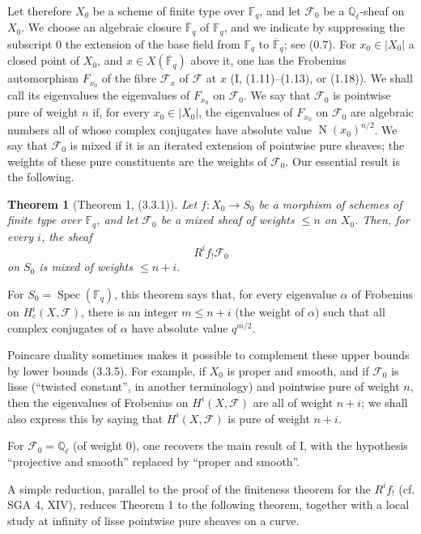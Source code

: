 \documentclass[11pt]{article}
\newtheorem{theorem}{Theorem}
\theoremstyle{remark}
\newcommand{\Ql}{\mathbb{Q}_\ell}
\newcommand{\Fq}{\mathbb{F}_q}
\newcommand{\Fbar}{\overline{\mathbb{F}}_q}
\newcommand{\Spec}{\operatorname{Spec}}
\newcommand{\Norm}{\operatorname{N}}
\begin{document}
Let therefore $X_0$ be a scheme of finite type over $\Fq$, and let $\mathcal F_0$ be a $\Ql$-sheaf on $X_0$. We choose an algebraic closure $\Fbar$ of $\Fq$, and we indicate by suppressing the subscript $0$ the extension of the base field from $\Fq$ to $\Fbar$; see (0.7). For $x_0\in |X_0|$ a closed point of $X_0$, and $x\in X(\Fbar)$ above it, one has the Frobenius automorphism $F_{x_0}$ of the fibre $\mathcal F_x$ of $\mathcal F$ at $x$ (I, (1.11)--(1.13), or (1.18)). We shall call its eigenvalues the eigenvalues of $F_{x_0}$ on $\mathcal F_0$. We say that $\mathcal F_0$ is pointwise pure of weight $n$ if, for every $x_0\in |X_0|$, the eigenvalues of $F_{x_0}$ on $\mathcal F_0$ are algebraic numbers all of whose complex conjugates have absolute value $\Norm(x_0)^{n/2}$. We say that $\mathcal F_0$ is mixed if it is an iterated extension of pointwise pure sheaves; the weights of these pure constituents are the weights of $\mathcal F_0$. Our essential result is the following.

\begin{theorem}[Theorem 1, (3.3.1)]
Let $f:X_0\to S_0$ be a morphism of schemes of finite type over $\Fq$, and let $\mathcal F_0$ be a mixed sheaf of weights $\le n$ on $X_0$. Then, for every $i$, the sheaf
\[
R^i f_{!}\mathcal F_0
\]
on $S_0$ is mixed of weights $\le n+i$.
\end{theorem}

For $S_0=\Spec(\Fq)$, this theorem says that, for every eigenvalue $\alpha$ of Frobenius on $H^i_c(X,\mathcal F)$, there is an integer $m\le n+i$ (the weight of $\alpha$) such that all complex conjugates of $\alpha$ have absolute value $q^{m/2}$.

Poincare duality sometimes makes it possible to complement these upper bounds by lower bounds (3.3.5). For example, if $X_0$ is proper and smooth, and if $\mathcal F_0$ is lisse (``twisted constant'', in another terminology) and pointwise pure of weight $n$, then the eigenvalues of Frobenius on $H^i(X,\mathcal F)$ are all of weight $n+i$; we shall also express this by saying that $H^i(X,\mathcal F)$ is pure of weight $n+i$.

For $\mathcal F_0=\Ql$ (of weight $0$), one recovers the main result of I, with the hypothesis ``projective and smooth'' replaced by ``proper and smooth''.

A simple reduction, parallel to the proof of the finiteness theorem for the $R^i f_{!}$ (cf. SGA 4, XIV), reduces Theorem 1 to the following theorem, together with a local study at infinity of lisse pointwise pure sheaves on a curve.
\end{document}
